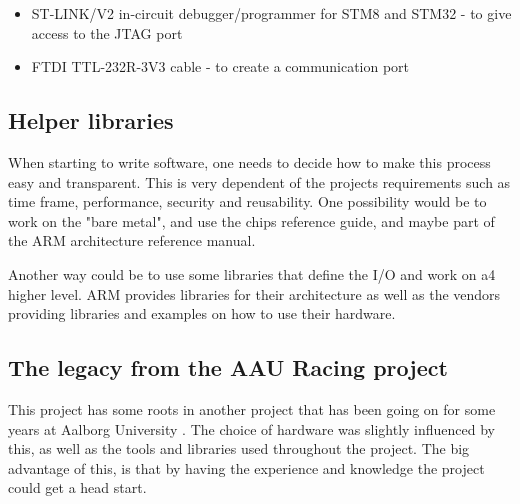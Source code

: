 \begin{itemize}[noitemsep]
	\item ST-LINK/V2 in-circuit debugger/programmer for STM8 and STM32
	\cite{st_link} - to give access to the JTAG port
	\item FTDI TTL-232R-3V3 cable \cite{ttl_usb} - to create a communication
	port
\end{itemize}

\subsection{Helper libraries}
When starting to write software, one needs to decide how to make this
process easy and transparent. This is very dependent of the
project\textquotesingle s requirements such as time frame, performance,
security and reusability. One possibility would be to work on the
"bare metal", and
use the chip\textquotesingle s reference guide\cite{reference_manual}, and maybe
part of the ARM architecture reference manual\cite{arm_architecture}.

Another way could be to use some libraries that define the I/O and work
on a4 higher level. ARM provides libraries for their architecture
as well as the vendors providing libraries and examples on how to use their
hardware.

\subsection{The legacy from the AAU Racing project}
This project has some roots in another project that has been going on
for some years at Aalborg University \cite{aauracing}.
The choice of hardware was
slightly influenced by this, as well as the tools and libraries used
throughout the project. The big advantage of this, is that by having the
experience and knowledge the project could get a head start.

